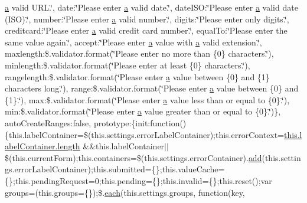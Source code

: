 \begin{DoxyCompactItemize}
\hyperlink{packages_2bootstrap_83_80_80_2content_2_scripts_2bootstrap_8min_8js_a7318f59fb86a4437995ee89c780c51ac}{a} valid U\+R\+L.\char`\"{}, date\+:\char`\"{}Please enter \hyperlink{packages_2bootstrap_83_80_80_2content_2_scripts_2bootstrap_8min_8js_a7318f59fb86a4437995ee89c780c51ac}{a} valid date.\char`\"{}, date\+I\+S\+O\+:\char`\"{}Please enter \hyperlink{packages_2bootstrap_83_80_80_2content_2_scripts_2bootstrap_8min_8js_a7318f59fb86a4437995ee89c780c51ac}{a} valid date (I\+S\+O).\char`\"{}, number\+:\char`\"{}Please enter \hyperlink{packages_2bootstrap_83_80_80_2content_2_scripts_2bootstrap_8min_8js_a7318f59fb86a4437995ee89c780c51ac}{a} valid number.\char`\"{}, digits\+:\char`\"{}Please enter only digits.\char`\"{}, creditcard\+:\char`\"{}Please enter \hyperlink{packages_2bootstrap_83_80_80_2content_2_scripts_2bootstrap_8min_8js_a7318f59fb86a4437995ee89c780c51ac}{a} valid credit card number.\char`\"{}, equal\+To\+:\char`\"{}Please enter the same value again.\char`\"{}, accept\+:\char`\"{}Please enter \hyperlink{packages_2bootstrap_83_80_80_2content_2_scripts_2bootstrap_8min_8js_a7318f59fb86a4437995ee89c780c51ac}{a} value with \hyperlink{packages_2bootstrap_83_80_80_2content_2_scripts_2bootstrap_8min_8js_a7318f59fb86a4437995ee89c780c51ac}{a} valid extension.\char`\"{}, maxlength\+:\$.\+validator.\+format(\char`\"{}Please enter no more than \{0\} characters.\char`\"{}), minlength\+:\$.\+validator.\+format(\char`\"{}Please enter at least \{0\} characters.\char`\"{}), rangelength\+:\$.\+validator.\+format(\char`\"{}Please enter \hyperlink{packages_2bootstrap_83_80_80_2content_2_scripts_2bootstrap_8min_8js_a7318f59fb86a4437995ee89c780c51ac}{a} value between \{0\} and \{1\} characters long.\char`\"{}), range\+:\$.\+validator.\+format(\char`\"{}Please enter \hyperlink{packages_2bootstrap_83_80_80_2content_2_scripts_2bootstrap_8min_8js_a7318f59fb86a4437995ee89c780c51ac}{a} value between \{0\} and \{1\}.\char`\"{}), max\+:\$.\+validator.\+format(\char`\"{}Please enter \hyperlink{packages_2bootstrap_83_80_80_2content_2_scripts_2bootstrap_8min_8js_a7318f59fb86a4437995ee89c780c51ac}{a} value less than or equal to \{0\}.\char`\"{}), min\+:\$.\+validator.\+format(\char`\"{}Please enter \hyperlink{packages_2bootstrap_83_80_80_2content_2_scripts_2bootstrap_8min_8js_a7318f59fb86a4437995ee89c780c51ac}{a} value greater than or equal to \{0\}.\char`\"{})\}, auto\+Create\+Ranges\+:false, prototype\+:\{init\+:function()\{this.\+label\+Container=\$(this.\+settings.\+error\+Label\+Container);this.\+error\+Context=\hyperlink{jquery-1_810_82-vsdoc_8js_aa7de35d58da66d9944ab9cbe82c19640}{this.\+label\+Container.\+length} \&\&this.\+label\+Container$\vert$$\vert$\$(this.\+current\+Form);this.\+containers=\$(this.\+settings.\+error\+Container).\hyperlink{jquery-1_810_82-vsdoc_8js_a2f34e089948aad779d5a43c9b381caa6}{add}(this.\+settings.\+error\+Label\+Container);this.\+submitted=\{\};this.\+value\+Cache=\{\};this.\+pending\+Request=0;this.\+pending=\{\};this.\+invalid=\{\};this.\+reset();var groups=(this.\+groups=\{\});\$.\hyperlink{packages_2j_query_81_810_82_2_content_2_scripts_2jquery-1_810_82_8min_8js_af24c9ea1e34372f8c8b312b35586008d}{each}(this.\+settings.\+groups, function(key, 
\end{DoxyCompactItemize}
